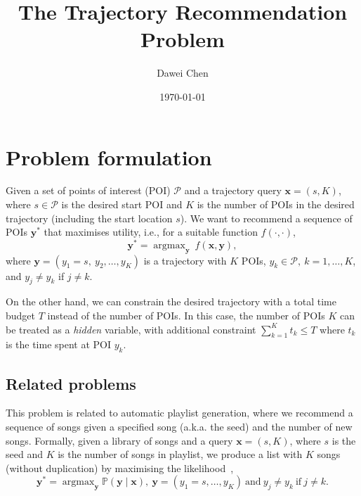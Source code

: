 \documentclass[9pt]{extarticle}
\title{The Trajectory Recommendation Problem}
\author{Dawei Chen}
\date{\today}
\DeclareMathOperator*{\argmax}{argmax}
\begin{document}
\maketitle


\section{Problem formulation}
\label{sec:formulation}

Given a set of points of interest (POI) $\mathcal{P}$ and a trajectory query $\mathbf{x} = (s, K)$,
where $s \in \mathcal{P}$ is the desired start POI and $K$ is the number of POIs in the desired trajectory (including the start location $s$).
We want to recommend a sequence of POIs $\mathbf{y}^*$ that maximises utility, i.e., for a suitable function $f(\cdot,\cdot)$,
\begin{equation*}
\mathbf{y}^* = \argmax_{\mathbf{y}}~f(\mathbf{x}, \mathbf{y}),
\end{equation*}
where $\mathbf{y} = (y_1 = s,~ y_2, \dots, y_K)$ is a trajectory with $K$ POIs, $y_k \in \mathcal{P},~ k=1,\dots,K$, and $y_j \ne y_k$ if $j \ne k$.

On the other hand, we can constrain the desired trajectory with a total time budget $T$ instead of the number of POIs.
In this case, the number of POIs $K$ can be treated as a \emph{hidden} variable, with additional constraint $\sum_{k=1}^K t_k \le T$ 
where $t_k$ is the time spent at POI $y_k$.



\subsection{Related problems}
\label{sec:related}

This problem is related to automatic playlist generation, 
where we recommend a sequence of songs given a specified song (a.k.a. the seed) and the number of new songs.
Formally, given a library of songs and a query $\mathbf{x} = (s, K)$, where $s$ is the seed and $K$ is the number of songs in playlist,
we produce a list with $K$ songs (without duplication) by maximising the likelihood~\cite{chen2012playlist},
\begin{equation*}
\mathbf{y}^* = \argmax_{\mathbf{y}} \mathbb{P}(\mathbf{y} \mid \mathbf{x}),~ \mathbf{y} = (y_1=s,\dots,y_K) ~\text{and}~ y_j \ne y_k ~\text{if}~ j \ne k.
\end{equation*}
\end{document}
